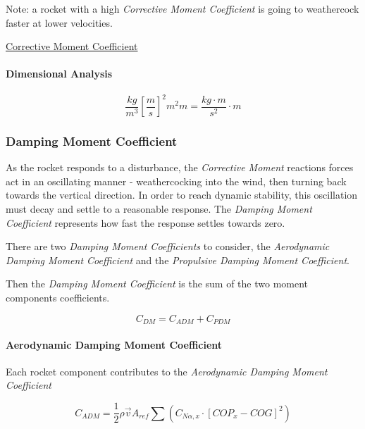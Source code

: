 \documentclass[]{article}
\let\oldparagraph\paragraph
\renewcommand{\paragraph}[1]{\oldparagraph{#1}\mbox{}}
\begin{document}
Note: a rocket with a high \emph{Corrective Moment Coefficient} is going
to weathercock faster at lower velocities.

\href{https://www.apogeerockets.com/education/downloads/Newsletter193.pdf}{Corrective
Moment Coefficient}

\paragraph{Dimensional Analysis}\label{dimensional-analysis}

\begin{equation}
\label{eq_c1_dim_anal}
\dfrac{kg}{m^3} \left[ \dfrac{m}{s} \right]^2 m^2 m = \dfrac{kg \cdot m }{s^2} \cdot m 
\end{equation}

\subsubsection{Damping Moment
Coefficient}\label{damping-moment-coefficient}

As the rocket responds to a disturbance, the \emph{Corrective Moment}
reactions forces act in an oscillating manner - weathercocking into the
wind, then turning back towards the vertical direction. In order to
reach dynamic stability, this oscillation must decay and settle to a
reasonable response. The \emph{Damping Moment Coefficient} represents
how fast the response settles towards zero.

There are two \emph{Damping Moment Coefficients} to consider, the
\emph{Aerodynamic Damping Moment Coefficient} and the \emph{Propulsive
Damping Moment Coefficient}.

Then the \emph{Damping Moment Coefficient} is the sum of the two moment
components coefficients.

\begin{equation}
\label{eq_coef_moment_damping}
C_{DM} = C_{ADM} + C_{PDM}
\end{equation}

\paragraph{Aerodynamic Damping Moment
Coefficient}\label{aerodynamic-damping-moment-coefficient}

Each rocket component contributes to the \emph{Aerodynamic Damping
Moment Coefficient}

\begin{equation}
\label{eq_coef_moment_damping_aero}
C_{ADM} = \dfrac{1}{2} \rho \vec{v} A_{ref} \sum \left( C_{N \alpha,x} \cdot \left[ COP_{x} - COG \right]^2  \right) 
\end{equation}
\end{document}
